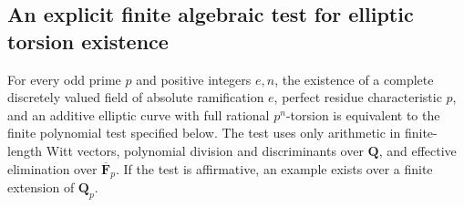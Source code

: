 \subsection{An explicit finite algebraic test for elliptic torsion existence}

\begin{proposition}
\label{prop:B-RD24-finite-test}
For every odd prime $p$ and positive integers $e,n$, the existence of a complete discretely valued field of absolute ramification $e$, perfect residue characteristic $p$, and an additive elliptic curve with full rational $p^n$-torsion is equivalent to the finite polynomial test specified below.  The test uses only arithmetic in finite-length Witt vectors, polynomial division and discriminants over $\mathbf Q$, and effective elimination over $\overline{\mathbf F}_p$.  If the test is affirmative, an example exists over a finite extension of $\mathbf Q_p$.
\end{proposition}

